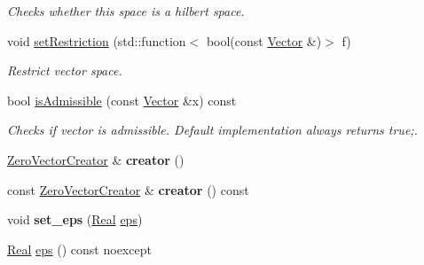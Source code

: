 \begin{DoxyCompactItemize}
\begin{DoxyCompactList}\small\item\em \-Checks whether this space is a hilbert space. \end{DoxyCompactList}\item 
void \hyperlink{classSpacy_1_1VectorSpace_a7c5f4a8c5937f9e07592483666b20ef7}{set\-Restriction} (std\-::function$<$ bool(const \hyperlink{classSpacy_1_1Vector}{\-Vector} \&)$>$ f)
\begin{DoxyCompactList}\small\item\em \-Restrict vector space. \end{DoxyCompactList}\item 
\hypertarget{classSpacy_1_1VectorSpace_a4beac78b082a364eb97e938b6c4928d2}{bool \hyperlink{classSpacy_1_1VectorSpace_a4beac78b082a364eb97e938b6c4928d2}{is\-Admissible} (const \hyperlink{classSpacy_1_1Vector}{\-Vector} \&x) const }\label{classSpacy_1_1VectorSpace_a4beac78b082a364eb97e938b6c4928d2}

\begin{DoxyCompactList}\small\item\em \-Checks if vector is admissible. \-Default implementation always returns true;. \end{DoxyCompactList}\item 
\hypertarget{classSpacy_1_1VectorSpace_a254d66fbb07d0abfaa583aba520d3dc3}{\hyperlink{classSpacy_1_1ZeroVectorCreator}{\-Zero\-Vector\-Creator} \& {\bfseries creator} ()}\label{classSpacy_1_1VectorSpace_a254d66fbb07d0abfaa583aba520d3dc3}

\item 
\hypertarget{classSpacy_1_1VectorSpace_acc3d5b5210cc810d8011e8a4308150e7}{const \hyperlink{classSpacy_1_1ZeroVectorCreator}{\-Zero\-Vector\-Creator} \& {\bfseries creator} () const }\label{classSpacy_1_1VectorSpace_acc3d5b5210cc810d8011e8a4308150e7}

\item 
\hypertarget{classSpacy_1_1Mixin_1_1Eps_a818ab6dfab5e4eea583e1302bcc621f8}{void {\bfseries set\-\_\-eps} (\hyperlink{classSpacy_1_1Real}{\-Real} \hyperlink{classSpacy_1_1Mixin_1_1Eps_a812b99b0abc1d78a34b4114907f23f52}{eps})}\label{classSpacy_1_1Mixin_1_1Eps_a818ab6dfab5e4eea583e1302bcc621f8}

\item 
\hypertarget{classSpacy_1_1Mixin_1_1Eps_a812b99b0abc1d78a34b4114907f23f52}{\hyperlink{classSpacy_1_1Real}{\-Real} \hyperlink{classSpacy_1_1Mixin_1_1Eps_a812b99b0abc1d78a34b4114907f23f52}{eps} () const noexcept}\label{classSpacy_1_1Mixin_1_1Eps_a812b99b0abc1d78a34b4114907f23f52}


\end{DoxyCompactItemize}
